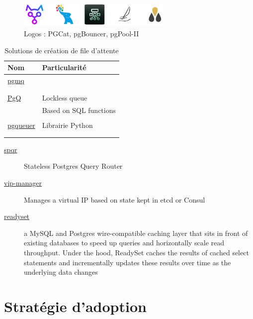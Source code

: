 \documentclass[a4paper,12pt]{article}
\begin{document}
\begin{multicols*}{2}
\begin{figure}[H]
\centering
\includegraphics[height=1.2cm]{icons/pg-loadbalancer.pdf}
\caption{\label{fig:org1b652d4}Logos : PGCat, pgBouncer, pgPool-II}
\end{figure}

\begin{table}[H]
\caption{Solutions de création de file d'attente}
\centering
\begin{tabular}{ll}
Nom & Particularité\\
\hline
\href{https://github.com/tembo-io/pgmq}{pgmq} & \\
 & \\
 & \\
\href{https://github.com/pgq/pgq}{PgQ} & Lockless queue\\
 & Based on SQL functions\\
 & \\
\href{https://github.com/janbjorge/PgQueuer}{pgqueuer} & Librairie Python\\
 & \\
 & \\
\end{tabular}
\end{table}

\begin{description}
\item[{\href{https://github.com/pg-sharding/spqr}{spqr}}] Stateless Postgres Query Router
\item[{\href{https://github.com/cybertec-postgresql/vip-manager}{vip-manager}}] Manages a virtual IP based on state kept in etcd or Consul
\item[{\href{https://github.com/readysettech/readyset}{readyset}}] a MySQL and Postgres wire-compatible caching layer that sits in front of existing databases to speed up queries and horizontally scale read throughput. Under the hood, ReadySet caches the results of cached select statements and incrementally updates these results over time as the underlying data changes
\end{description}
\section*{Stratégie d’adoption}
\label{sec:org0b27c94}

\end{multicols*}
\end{document}
